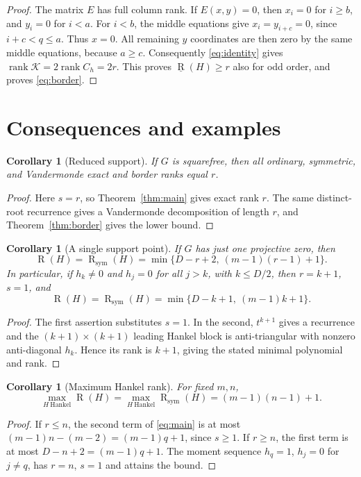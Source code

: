 \documentclass[11pt]{article}
\newtheorem{corollary}[theorem]{Corollary}
\theoremstyle{definition}
\theoremstyle{remark}
\newcommand{\Rk}{\operatorname{R}}
\newcommand{\SR}{\operatorname{R}_{\mathrm{sym}}}
\newcommand{\BR}{\underline{\operatorname{R}}}
\newcommand{\rank}{\operatorname{rank}}
\begin{document}
\begin{proof}
The matrix $E$ has full column rank. If $E(x,y)=0$, then
$x_i=0$ for $i\ge b$, and $y_i=0$ for $i<a$.
For $i<b$, the middle equations give $x_i=y_{i+c}=0$, since $i+c<q\le a$.
Thus $x=0$. All remaining $y$ coordinates are then zero by the same middle
equations, because $a\ge c$.
Consequently \eqref{eq:identity} gives
$\rank\mathcal K=2\rank C_h=2r$.
This proves $\BR(H)\ge r$ also for odd order, and proves \eqref{eq:border}.
\end{proof}

\section{Consequences and examples}\label{sec:examples}

\begin{corollary}[Reduced support]
If $G$ is squarefree, then all ordinary, symmetric, and Vandermonde exact and
border ranks equal $r$.
\end{corollary}
\begin{proof}
Here $s=r$, so Theorem~\ref{thm:main} gives exact rank $r$.
The same distinct-root recurrence gives a Vandermonde decomposition of length
$r$, and Theorem~\ref{thm:border} gives the lower bound.
\end{proof}

\begin{corollary}[A single support point]
If $G$ has just one projective zero, then
\[
 \Rk(H)=\SR(H)=\min\{D-r+2,\ (m-1)(r-1)+1\}.
\]
In particular, if $h_k\ne0$ and $h_j=0$ for all $j>k$, with $k\le D/2$, then
$r=k+1$, $s=1$, and
\[
 \Rk(H)=\SR(H)=\min\{D-k+1,\ (m-1)k+1\}.
\]
\end{corollary}
\begin{proof}
The first assertion substitutes $s=1$. In the second, $t^{k+1}$ gives a
recurrence and the $(k+1)\times(k+1)$ leading Hankel block is anti-triangular
with nonzero anti-diagonal $h_k$. Hence its rank is $k+1$, giving the stated
minimal polynomial and rank.
\end{proof}

\begin{corollary}[Maximum Hankel rank]\label{cor:max}
For fixed $m,n$,
\[
 \max_{H\ \mathrm{Hankel}}\Rk(H)
 =\max_{H\ \mathrm{Hankel}}\SR(H)=(m-1)(n-1)+1.
\]
\end{corollary}
\begin{proof}
If $r\le n$, the second term of \eqref{eq:main} is at most
$(m-1)n-(m-2)=(m-1)q+1$, since $s\ge1$.
If $r\ge n$, the first term is at most $D-n+2=(m-1)q+1$.
The moment sequence $h_q=1$, $h_j=0$ for $j\ne q$, has $r=n$, $s=1$ and
attains the bound.
\end{proof}
\end{document}
